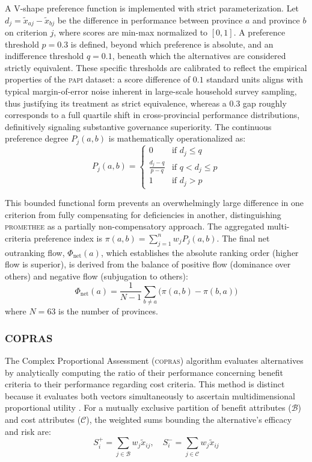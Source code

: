 \documentclass[12pt,a4paper]{article}
\newcommand{\PAPI}{\textsc{papi}\xspace}
\newcommand{\COPRAS}{\textsc{copras}\xspace}
\begin{document}
A V-shape preference function is implemented with strict parameterization. Let \( d_j = \tilde{x}_{aj} - \tilde{x}_{bj} \) be the difference in performance between province \( a \) and province \( b \) on criterion \( j \), where scores are min-max normalized to $[0,1]$. A preference threshold \( p = 0.3 \) is defined, beyond which preference is absolute, and an indifference threshold \( q = 0.1 \), beneath which the alternatives are considered strictly equivalent. These specific thresholds are calibrated to reflect the empirical properties of the \PAPI dataset: a score difference of $0.1$ standard units aligns with typical margin-of-error noise inherent in large-scale household survey sampling, thus justifying its treatment as strict equivalence, whereas a $0.3$ gap roughly corresponds to a full quartile shift in cross-provincial performance distributions, definitively signaling substantive governance superiority. The continuous preference degree \( P_j(a,b) \) is mathematically operationalized as:
\begin{equation}
    P_j(a,b) = 
    \begin{cases} 
        0 & \text{if } d_j \leq q \\
        \frac{d_j - q}{p - q} & \text{if } q < d_j \leq p \\
        1 & \text{if } d_j > p 
    \end{cases}
\end{equation}

This bounded functional form prevents an overwhelmingly large difference in one criterion from fully compensating for deficiencies in another, distinguishing \textsc{promethee} as a partially non-compensatory approach. The aggregated multi-criteria preference index is \( \pi(a,b) = \sum_{j=1}^{n} w_j P_j(a,b) \). The final net outranking flow, \( \Phi_{\text{net}}(a) \), which establishes the absolute ranking order (higher flow is superior), is derived from the balance of positive flow (dominance over others) and negative flow (subjugation to others):
\begin{equation}
\label{eq:promethee_net}
    \Phi_{\text{net}}(a) = \frac{1}{N - 1} \sum_{b \neq a} \Big( \pi(a,b) - \pi(b,a) \Big)
\end{equation}
where $N = 63$ is the number of provinces.

\subsubsection{COPRAS}
\label{subsubsec:copras}
The Complex Proportional Assessment (\COPRAS) algorithm evaluates alternatives by analytically computing the ratio of their performance concerning benefit criteria to their performance regarding cost criteria. This method is distinct because it evaluates both vectors simultaneously to ascertain multidimensional proportional utility \citep{Zavadskas1994}. For a mutually exclusive partition of benefit attributes (\( \mathcal{B} \)) and cost attributes (\( \mathcal{C} \)), the weighted sums bounding the alternative's efficacy and risk are:
\begin{equation}
    S_i^+ = \sum_{j \in \mathcal{B}} w_j \tilde{x}_{ij}, \quad S_i^- = \sum_{j \in \mathcal{C}} w_j \tilde{x}_{ij}
\end{equation}
\end{document}
